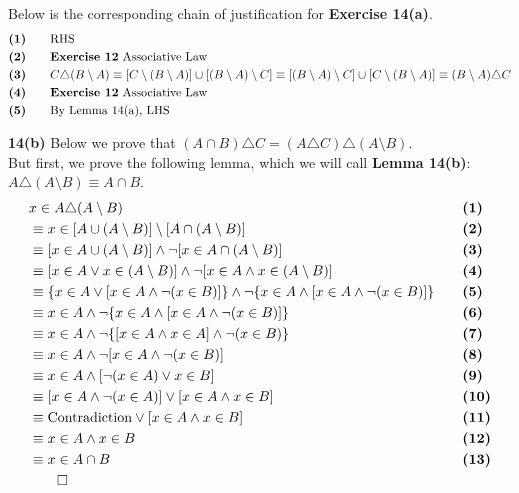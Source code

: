 Below is the corresponding chain of justification for \textbf{Exercise 14(a)}.
\begin{alignat*}{2}
&\textbf{(1)} && \quad \text{RHS}\\
&\textbf{(2)} && \quad \text{\textbf{Exercise 12} Associative Law}\\
&\textbf{(3)} && \quad C \triangle (B \setminus A) \equiv [C \setminus (B \setminus A)] \cup [(B \setminus A) \setminus C] \equiv [(B \setminus A) \setminus C] \cup [C \setminus (B \setminus A)] \equiv (B \setminus A) \triangle C\\
&\textbf{(4)} && \quad \text{\textbf{Exercise 12} Associative Law}\\
&\textbf{(5)} && \quad \text{By Lemma 14(a), LHS}\\
\end{alignat*}
\pagebreak

\textbf{14(b)} Below we prove that $(A \cap B) \triangle C = (A \triangle C) \triangle (A \setminus B)$.\\
But first, we prove the following lemma, which we will call \textbf{Lemma 14(b)}: $A \triangle (A \setminus B) \equiv A \cap B$.
\begin{alignat*}{2}
&x \in A \triangle (A \setminus B)  && \quad \textbf{(1)} \\
&\equiv x \in [A \cup (A \setminus B)] \setminus [A \cap (A \setminus B)] && \quad \textbf{(2)}\\
&\equiv [x \in A \cup (A \setminus B)] \wedge \neg [x \in A \cap (A \setminus B)] && \quad \textbf{(3)}\\
&\equiv [x \in A \vee x \in (A \setminus B)] \wedge \neg [x \in A \wedge x \in (A \setminus B)] && \quad \textbf{(4)}\\
&\equiv \{x \in A \vee [x \in A \wedge \neg (x \in B)]\} \wedge \neg \{x \in A \wedge [x \in A \wedge \neg (x \in B)]\} && \quad \textbf{(5)}\\
&\equiv x \in A \wedge \neg \{x \in A \wedge [x \in A \wedge \neg (x \in B)]\} && \quad \textbf{(6)}\\
&\equiv x \in A \wedge \neg \{[x \in A \wedge x \in A] \wedge \neg (x \in B)\} && \quad \textbf{(7)}\\
&\equiv x \in A \wedge \neg [x \in A\wedge \neg (x \in B)] && \quad \textbf{(8)}\\
&\equiv x \in A \wedge [\neg (x \in A) \vee x \in B] && \quad \textbf{(9)}\\
&\equiv [x \in A \wedge \neg (x \in A)] \vee [x \in A \wedge x \in B] && \quad \textbf{(10)}\\
&\equiv \text{Contradiction} \vee [x \in A \wedge x \in B] && \quad \textbf{(11)}\\
&\equiv x \in A \wedge x \in B && \quad \textbf{(12)}\\
&\equiv x \in A \cap B && \quad \textbf{(13)}\\
&\qed
\end{alignat*}

